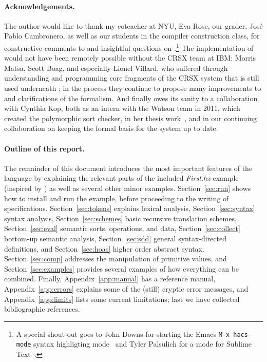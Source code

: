 \documentclass[12pt]{article} %
\begin{document}
\paragraph*{Acknowledgements.}

The author would like to thank my coteacher at NYU, Eva Rose, our grader, José Pablo Cambronero, as
well as our students in the compiler construction class, for constructive comments to and insightful
questions on \HAX.\footnote{A special shout-out goes to John Downs for starting the Emacs
  \texttt{M-x hacs-mode} syntax highligting mode~\cite{git:hacsel} and Tyler Palsulich for a \HAX
  mode for Sublime Text~\cite{git:hacs-sublime}.}
The implementation of \HAX would not have been remotely possible without the CRSX team at IBM:
Morris Matsa, Scott Boag, and especially Lionel Villard, who suffered through understanding and
programming core fragments of the CRSX system that is still used underneath \HAX; in the process
they continue to propose many improvements to and clarifications of the formalism.
And finally \HAX owes its sanity to a collaboration with Cynthia Kop, both as an intern with the
Watson team in 2011, which created the polymorphic sort checker, in her thesis work~\cite{Kop:2012},
and in our continuing collaboration on keeping the formal basis for the system up to date.

\paragraph*{Outline of this report.}

The remainder of this document introduces the most important features of the \HAX language by
explaining the relevant parts of the included \emph{First.hx} example (inspired by
\cite[Figure~1.7]{Aho+:2006}) as well as several other minor examples.
Section~\ref{sec:run} shows how to install \HAX and run the example, before proceeding to
the writing of specifications. %
Section~\ref{sec:tokens} explains lexical analysis, %
Section~\ref{sec:syntax} syntax analysis, %
Section~\ref{sec:schemes} basic recursive translation schemes, %
Section~\ref{sec:eval} semantic sorts, operations, and data, %
Section~\ref{sec:collect} bottom-up semantic analysis, %
Section~\ref{sec:sdd} general syntax-directed definitions, %
and Section~\ref{sec:hoas} higher order abstract syntax. %
Section~\ref{sec:comp} addresses the manipulation of primitive values, %
and Section~\ref{sec:examples} provides several examples of how everything can be combined.
Finally, %
Appendix~\ref{app:manual} has a reference manual, %
Appendix~\ref{app:errors} explains some of the (still) cryptic error messages, %
and Appendix~\ref{app:limits} lists some current limitations;
last we have collected bibliographic references.
\end{document}
